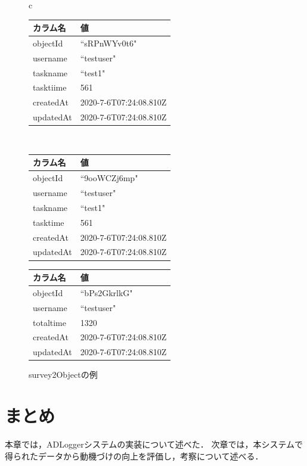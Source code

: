 \begin{figure}[htb]
\begin{center}
\begin{tabular}{c}

\begin{minipage}[htb]{\linewidth}
\begin{center}
  \begin{tabular}{|l|l|} \hline
    カラム名 & 値 \\ \hline
    objectId & ``sRPnWYv0t6" \\
    username & ``testuser" \\
    taskname & ``test1" \\
    tasktiime & 561 \\ 
    createdAt & 2020-7-6T07:24:08.810Z  \\
    updatedAt & 2020-7-6T07:24:08.810Z \\ \hline
  \end{tabular}
   \caption{tasktimeObjectの例}
  \label{tb:tasktime_object}
\end{center}
\end{minipage}

\\

\begin{minipage}[htb]{0.5\linewidth}
\begin{center}
  \begin{tabular}{|l|l|} \hline
    カラム名 & 値 \\ \hline
    objectId & ``9ooWCZj6mp" \\
    username & ``testuser" \\
    taskname & ``test1" \\
    tasktime & 561 \\ 
    createdAt & 2020-7-6T07:24:08.810Z  \\
    updatedAt & 2020-7-6T07:24:08.810Z \\ \hline
  \end{tabular}
  \caption{surveyObjectの例}
  \label{tb:survey_object}
\end{center}
\end{minipage}

\begin{minipage}[htb]{0.5\linewidth}
\begin{center}
  \begin{tabular}{|l|l|} \hline
    カラム名 & 値 \\ \hline
    objectId & ``bPs2GkrlkG" \\
    username & ``testuser" \\
    totaltime & 1320 \\ 
    createdAt & 2020-7-6T07:24:08.810Z  \\
    updatedAt & 2020-7-6T07:24:08.810Z \\ \hline
  \end{tabular}
  \caption{survey2Objectの例}
  \label{tb:survey2_object}
\end{center}
\end{minipage}
\end{tabular}
\end{center}
\end{figure}


\section{まとめ}
本章では，ADLoggerシステムの実装について述べた．
次章では，本システムで得られたデータから動機づけの向上を評価し，考察について述べる．
